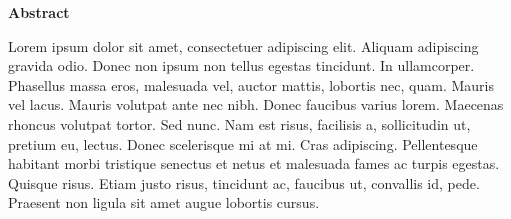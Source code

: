 \documentclass{tex/martin}
\begin{document}
\vspace{1 cm}

\begin{center}
\sffamily\textbf{Abstract} 
\end{center}
Lorem ipsum dolor sit amet, consectetuer adipiscing elit. Aliquam adipiscing gravida odio. Donec non ipsum non tellus egestas tincidunt. In ullamcorper. Phasellus massa eros, malesuada vel, auctor mattis, lobortis nec, quam. Mauris vel lacus. Mauris volutpat ante nec nibh. Donec faucibus varius lorem. Maecenas rhoncus volutpat tortor. Sed nunc. Nam est risus, facilisis a, sollicitudin ut, pretium eu, lectus. Donec scelerisque mi at mi. Cras adipiscing. Pellentesque habitant morbi tristique senectus et netus et malesuada fames ac turpis egestas. Quisque risus. Etiam justo risus, tincidunt ac, faucibus ut, convallis id, pede. Praesent non ligula sit amet augue lobortis cursus.


\setcounter{tocdepth}{3}   %
\cleardoublepage

\setcounter{page}{1}
\tableofcontents %

\listoffigures

\listoftables


\setlength{\parskip}{12pt}      %
\setlength{\parindent}{0pt}     %
\setlength{\mathindent}{24pt}
\renewcommand{\thesection}{\arabic{section}}

\cleardoublepage
{}
\setcounter{page}{1}     %

\pagestyle{plain}

\end{document}
